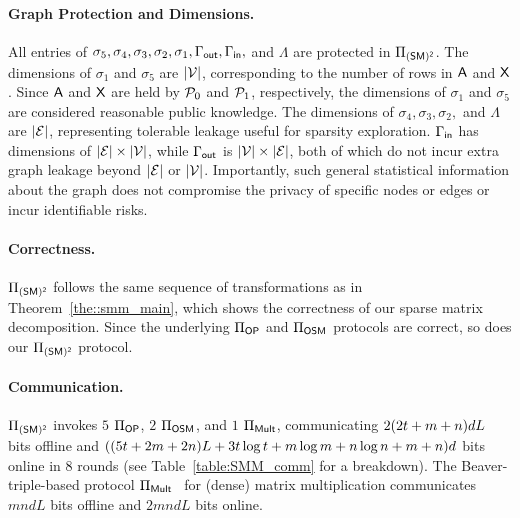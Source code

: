 \paragraph{Graph Protection and  Dimensions.}
All entries of $\sigma_5, \sigma_4, \sigma_3, \sigma_2, \sigma_1, \allowbreak\Gamma_{\mathsf{out}}, \Gamma_{\mathsf{in}},$ and $\Lambda$ are protected in $\Pi_{\mathsf{(SM)^2}}$.
The dimensions of $\sigma_1$ and $\sigma_5$ are $|\mathcal{V}|$, corresponding to the number of rows in $\mathsf{A}$ and $\mathsf{X}$. Since $\mathsf{A}$ and $\mathsf{X}$ are held by $\mathcal{P}_0$ and $\mathcal{P}_1$, respectively, the dimensions of $\sigma_1$ and $\sigma_5$ are considered reasonable public knowledge.
The dimensions of $\sigma_4, \sigma_3, \sigma_2,$ and $\Lambda$ are $|\mathcal{E}|$, representing tolerable leakage useful for sparsity exploration.
$\Gamma_{\mathsf{in}}$ has dimensions of $|\mathcal{E}| \times |\mathcal{V}|$, while $\Gamma_{\mathsf{out}}$ is $|\mathcal{V}| \times |\mathcal{E}|$, both of which do not incur extra graph leakage beyond $|\mathcal{E}|$ or $|\mathcal{V}|$.
Importantly, such general statistical information  about the graph does not compromise the privacy of specific nodes or edges or incur identifiable risks.

\paragraph{Correctness.}
$\Pi_{\mathsf{(SM)^2}}$ follows the same sequence of transformations as in Theorem~\ref{the::smm_main}, which shows the correctness of our sparse matrix decomposition.
Since the underlying ${\Pi}_{\mathsf{OP}}$ and $\Pi_{\mathsf{OSM}}$ protocols are correct, so does
our $\Pi_{\mathsf{(SM)^2}}$ protocol.


\paragraph{Communication.}
$\Pi_{\mathsf{(SM)^2}}$ invokes $5$ ${\Pi}_{\mathsf{OP}}$, $2$ $\Pi_{\mathsf{OSM}}$, and $1$ $\Pi_{\mathsf{Mult}}$, communicating $2(2t + m + n)dL$ bits offline and $((5t + 2m + 2n)L + 3t \log t + m\log m + n\log n + m + n)d$ bits online in $8$ rounds (see Table~\ref{table:SMM_comm} for a breakdown).
The Beaver-triple-based protocol $\Pi_{\mathsf{Mult}}$~\cite{crypto/Beaver91a} for (dense) matrix multiplication communicates $mndL$ bits offline and $2mndL$ bits online.

